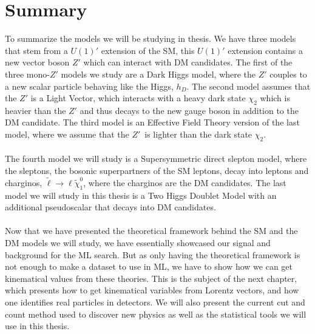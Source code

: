 \documentclass[12pt, a4paper]{book}
\begin{document}
\section{Summary}
To summarize the models we will be studying in thesis. We have three models that stem from a $U(1)'$ extension of the SM, this $U(1)'$ extension contains a new vector boson $Z'$ which can interact with DM candidates. The first of the three mono-$Z'$ models we study are a Dark Higgs model, where the $Z'$ couples to 
a new scalar particle behaving like the Higgs, $h_D$. The second model assumes that the $Z'$ is a Light Vector, which interacts with a heavy dark state $\chi_2$ which is heavier than the $Z'$ and thus decays to the new gauge boson in addition to the DM candidate. The third model is an Effective Field Theory version 
of the last model, where we assume that the $Z'$ is lighter than the dark state $\chi_2$. \\
\\The fourth model we will study is a Supersymmetric direct slepton model, where the sleptons, the bosonic superpartners of the SM leptons, decay into leptons and charginos, $\tilde{\ell}\rightarrow \ell\tilde{\chi}_1^0$, where the charginos are the DM candidates. The last model we will study in this thesis 
is a Two Higgs Doublet Model with an additional pseudoscalar that decays into DM candidates. \\ 
\\Now that we have presented the theoretical framework behind the SM and the DM models we will study, we have essentially showcased our signal and background for the ML search. But as only having the theoretical framework is not enough to make a dataset to use in ML, we have to show how we can get kinematical 
values from these theories. This is the subject of the next chapter, which presents how to get kinematical variables from Lorentz vectors, and how one identifies real particles in detectors. We will also present the current cut and count method used to discover new physics 
as well as the statistical tools we will use in this thesis.
\end{document}
